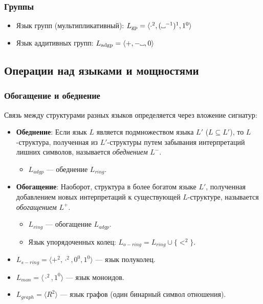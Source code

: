 \documentclass[12pt,a4paper,oneside,openany]{book}
\theoremstyle{definition}
\theoremstyle{plain}
\theoremstyle{remark}
\newcommand{\blank}[1][1.2ex]{%
  \mbox{%
    \vrule width 0.1ex height 0.4ex depth 0pt %
    \vrule width #1 height 0.1ex depth 0pt    %
    \vrule width 0.1ex height 0.4ex depth 0pt %
  }%
}
\begin{document}
\subsubsection{Группы}
\begin{itemize}
    \item Язык групп (мультипликативный): $L_{\text{gp}} = \langle \cdot^2, (\blank^{-1})^1, 1^0 \rangle$
    \item Язык аддитивных групп: $L_{\text{adgp}} = \langle +, -\blank, 0 \rangle$
\end{itemize}
\subsection{Операции над языками и мощностями}

\subsubsection{Обогащение и обеднение}
Связь между структурами разных языков определяется через вложение сигнатур:
\begin{itemize}
    \item \textbf{Обеднение}: Если язык $L$ является подмножеством языка $L'$ ($L \subseteq L'$), то $L$-структура, полученная из $L'$-структуры путем забывания интерпретаций лишних символов, называется \textit{обеднением} $L^{-}$. 
    \begin{itemize}
        \item  $L_{adgp}$ —  обеднение $L_{ring}$.
    \end{itemize}
    \item \textbf{Обогащение}: Наоборот, структура в более богатом языке $L'$, полученная добавлением новых интерпретаций к существующей $L$-структуре, называется \textit{обогащением} $L^{+}$.
    \begin{itemize}
        \item  $L_{ring}$ —  обогащение $L_{adgp}$.
        \item Язык упорядоченных колец: $L_{o-ring} = L_{ring} \cup \{ <^2 \}$.
    \end{itemize}
\end{itemize}

\begin{itemize}
    \item $L_{s-ring} = \langle +^2, \cdot^2, 0^0, 1^0 \rangle$ — язык полуколец.
    \item $L_{mon} = \langle \cdot^2, 1^0 \rangle$ — язык моноидов.
    \item $L_{graph} = \langle R^2 \rangle$ — язык графов (один бинарный символ отношения).
\end{itemize}
\end{document}

